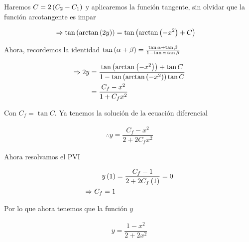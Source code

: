 \begin{enumerate}
Haremos $C=2\left( C_2-C_1 \right)$ y aplicaremos la función tangente, sin olvidar que la función arcotangente es impar

\begin{align*}
    \Rightarrow \tan\left( \arctan\left( 2y \right) \right)&=\tan\left( \arctan\left( -x^2 \right)+C \right) 
\end{align*}

Ahora, recordemos la identidad $\tan\left( \alpha+\beta \right)=\frac{\tan\alpha+\tan\beta}{1-\tan\alpha\tan\beta}$

\begin{align*}
    \Rightarrow 2y &= \dfrac{\tan\left( \arctan\left( -x^2 \right) \right)+\tan C}{1-\tan\left( \arctan\left( -x^2 \right) \right)\tan{C}} \\
    &=\dfrac{C_f - x^2}{1+C_f x^2}
\end{align*}

Con $C_f=\tan C$. Ya tenemos la solución de la ecuación diferencial

\begin{align*}
    \therefore y = \dfrac{C_f-x^2}{2+2C_fx^2}
\end{align*}

Ahora resolvamos el PVI

\begin{align*}
    y\left( 1 \right)&=\dfrac{C_f-1}{2+2C_f\left( 1 \right)}=0 \\
    \Rightarrow C_f=1
\end{align*}

Por lo que ahora tenemos que la función $y$

\begin{align*}
    y=\dfrac{1-x^2}{2+2x^2}
\end{align*}

\begin{center}
\end{center}





\end{enumerate}